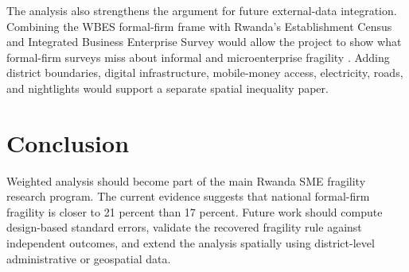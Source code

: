 \documentclass[man,12pt,floatsintext]{apa7}
\let\citep\parencite
\begin{document}
The analysis also strengthens the argument for future external-data integration. Combining the WBES formal-firm frame with Rwanda's Establishment Census and Integrated Business Enterprise Survey would allow the project to show what formal-firm surveys miss about informal and microenterprise fragility \citep{nisr2024establishment, nisr2025ibes}. Adding district boundaries, digital infrastructure, mobile-money access, electricity, roads, and nightlights would support a separate spatial inequality paper.

\section{Conclusion}

Weighted analysis should become part of the main Rwanda SME fragility research program. The current evidence suggests that national formal-firm fragility is closer to 21 percent than 17 percent. Future work should compute design-based standard errors, validate the recovered fragility rule against independent outcomes, and extend the analysis spatially using district-level administrative or geospatial data.

\printbibliography
\end{document}
